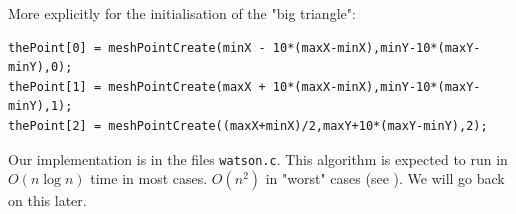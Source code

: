 More explicitly for the initialisation of the "big triangle": 
\begin{verbatim}
thePoint[0] = meshPointCreate(minX - 10*(maxX-minX),minY-10*(maxY-minY),0);
thePoint[1] = meshPointCreate(maxX + 10*(maxX-minX),minY-10*(maxY-minY),1);
thePoint[2] = meshPointCreate((maxX+minX)/2,maxY+10*(maxY-minY),2);
\end{verbatim}

Our implementation is in the files \texttt{watson.c}.
This algorithm is expected to run in $O(n \log n)$ time in most cases. $O(n^2)$ in "worst" cases (see \cite{de2000computational}). We will go back on this later.

\newpage